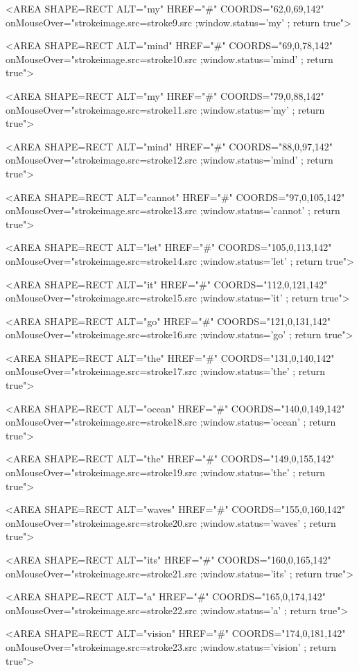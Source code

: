 \documentclass[11pt]{article}
\begin{document}
\begin{enumerate}
\begin{SOURCE}
<AREA SHAPE=RECT ALT="my" HREF="\#" COORDS="62,0,69,142"
onMouseOver="strokeimage.src=stroke9.src ;window.status='my' ; return
true">

<AREA SHAPE=RECT ALT="mind" HREF="\#" COORDS="69,0,78,142"
onMouseOver="strokeimage.src=stroke10.src ;window.status='mind' ;
return true">

<AREA SHAPE=RECT ALT="my" HREF="\#" COORDS="79,0,88,142"
onMouseOver="strokeimage.src=stroke11.src ;window.status='my' ; return
true">

<AREA SHAPE=RECT ALT="mind" HREF="\#" COORDS="88,0,97,142"
onMouseOver="strokeimage.src=stroke12.src ;window.status='mind' ;
return true">

<AREA SHAPE=RECT ALT="cannot" HREF="\#" COORDS="97,0,105,142"
onMouseOver="strokeimage.src=stroke13.src ;window.status='cannot' ;
return true">

<AREA SHAPE=RECT ALT="let" HREF="\#" COORDS="105,0,113,142"
onMouseOver="strokeimage.src=stroke14.src ;window.status='let' ;
return true">

<AREA SHAPE=RECT ALT="it" HREF="\#" COORDS="112,0,121,142"
onMouseOver="strokeimage.src=stroke15.src ;window.status='it' ; return
true">

<AREA SHAPE=RECT ALT="go" HREF="\#" COORDS="121,0,131,142"
onMouseOver="strokeimage.src=stroke16.src ;window.status='go' ; return
true">

<AREA SHAPE=RECT ALT="the" HREF="\#" COORDS="131,0,140,142"
onMouseOver="strokeimage.src=stroke17.src ;window.status='the' ;
return true">


<AREA SHAPE=RECT ALT="ocean" HREF="\#" COORDS="140,0,149,142"
onMouseOver="strokeimage.src=stroke18.src ;window.status='ocean' ;
return true">

<AREA SHAPE=RECT ALT="the" HREF="\#" COORDS="149,0,155,142"
onMouseOver="strokeimage.src=stroke19.src ;window.status='the' ;
return true">

<AREA SHAPE=RECT ALT="waves" HREF="\#" COORDS="155,0,160,142"
onMouseOver="strokeimage.src=stroke20.src ;window.status='waves' ;
return true">

<AREA SHAPE=RECT ALT="its" HREF="\#" COORDS="160,0,165,142"
onMouseOver="strokeimage.src=stroke21.src ;window.status='its' ;
return true">

<AREA SHAPE=RECT ALT="a" HREF="\#" COORDS="165,0,174,142"
onMouseOver="strokeimage.src=stroke22.src ;window.status='a' ; return
true">

<AREA SHAPE=RECT ALT="vision" HREF="\#" COORDS="174,0,181,142"
onMouseOver="strokeimage.src=stroke23.src ;window.status='vision' ;
return true">
\end{SOURCE}


\end{enumerate}
\end{document}
